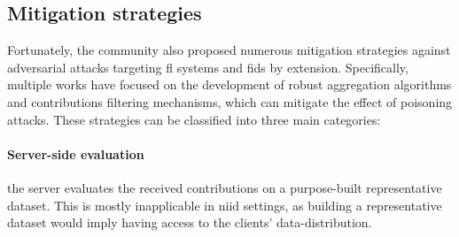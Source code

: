 \documentclass[conference]{IEEEtran}
\begin{document}
    
    




\subsection{Mitigation strategies}

Fortunately, the community also proposed numerous mitigation strategies against adversarial attacks targeting \gls{fl} systems and \gls{fids} by extension.
Specifically, multiple works have focused on the development of robust aggregation algorithms and contributions filtering mechanisms, which can mitigate the effect of poisoning attacks.
These strategies can be classified into three main categories:

\paragraph*{Server-side evaluation} the server evaluates the received contributions on a purpose-built representative dataset.
This is mostly inapplicable in \gls{niid} settings, as building a representative dataset would imply having access to the clients' data-distribution.
    
\end{document}
